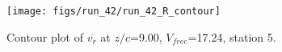\begin{figure}[H]
\centering
\texttt{[image: figs/run\_42/run\_42\_R\_contour]}
\caption{Contour plot of $\overline{v_{r}}$ at $z/c$=9.00, $V_{free}$=17.24, station 5.}
\label{fig:run_42_R_contour}
\end{figure}


